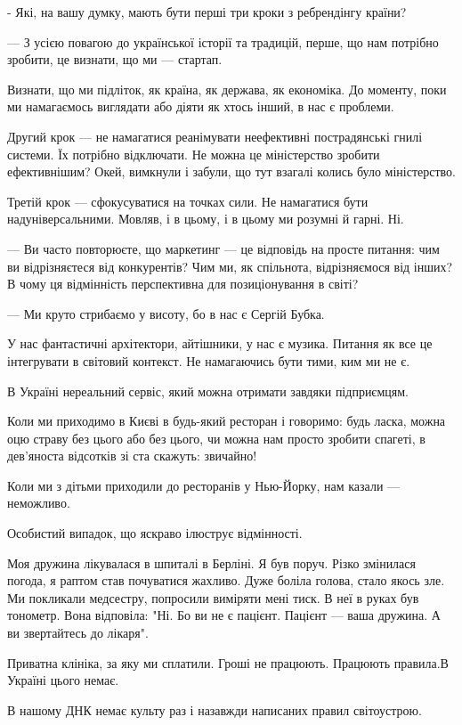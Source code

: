 - Які, на вашу думку, мають бути перші три кроки з ребрендінгу країни? 

--- З усією повагою до української історії та традицій, перше, що нам потрібно зробити, це визнати, що ми --- стартап. 

Визнати, що ми підліток, як країна, як держава, як економіка. До моменту, поки
ми намагаємось виглядати або діяти як хтось інший, в нас є проблеми.

Другий крок --- не намагатися реанімувати неефективні пострадянські гнилі
системи. Їх потрібно відключати. Не можна це міністерство зробити ефективнішим?
Окей, вимкнули і забули, що тут взагалі колись було міністерство.

Третій крок --- сфокусуватися на точках сили. Не намагатися бути
надуніверсальними. Мовляв, і в цьому, і в цьому ми розумні й гарні. Ні.

--- Ви часто повторюєте, що маркетинг --- це відповідь на просте питання: чим ви
відрізняєтеся від конкурентів? Чим ми, як спільнота, відрізняємося від інших? В
чому ця відмінність перспективна для позиціонування в світі?

--- Ми круто стрибаємо у висоту, бо в нас є Сергій Бубка.

У нас фантастичні архітектори, айтішники, у нас є музика. Питання як все це
інтегрувати в світовий контекст. Не намагаючись бути тими, ким ми не є.

В Україні нереальний сервіс, який можна отримати завдяки підприємцям.

Коли ми приходимо в Києві в будь-який ресторан і говоримо: будь ласка, можна
оцю страву без цього або без цього, чи можна нам просто зробити спагеті, в
дев’яноста відсотків зі ста скажуть: звичайно!

Коли ми з дітьми приходили до ресторанів у Нью-Йорку, нам казали --- неможливо.

Особистий випадок, що яскраво ілюструє відмінності.

Моя дружина лікувалася в шпиталі в Берліні. Я був поруч. Різко змінилася
погода, я раптом став почуватися жахливо. Дуже боліла голова, стало якось зле.
Ми покликали медсестру, попросили виміряти мені тиск. В неї в руках був
тонометр. Вона відповіла: "Ні. Бо ви не є пацієнт. Пацієнт --- ваша дружина. А ви
звертайтесь до лікаря".

Приватна клініка, за яку ми сплатили. Гроші не працюють. Працюють правила.В
Україні цього немає. 

В нашому ДНК немає культу раз і назавжди написаних правил світоустрою.

